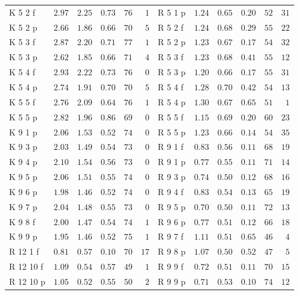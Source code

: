 \begin{tabular}{@{}lrrrrr@{\hspace{14pt}}lrrrrr@{}}
K 5 2 f & $2.97$ & $2.25$ & $0.73$ & $76$ & $1$ & R 5 1 p & $1.24$ & $0.65$ & $0.20$ & $52$ & $31$ \\
K 5 2 p & $2.66$ & $1.86$ & $0.66$ & $70$ & $5$ & R 5 2 f & $1.24$ & $0.68$ & $0.29$ & $55$ & $22$ \\
K 5 3 f & $2.87$ & $2.20$ & $0.71$ & $77$ & $1$ & R 5 2 p & $1.23$ & $0.67$ & $0.17$ & $54$ & $32$ \\
K 5 3 p & $2.62$ & $1.85$ & $0.66$ & $71$ & $4$ & R 5 3 f & $1.23$ & $0.68$ & $0.41$ & $55$ & $12$ \\
K 5 4 f & $2.93$ & $2.22$ & $0.73$ & $76$ & $0$ & R 5 3 p & $1.20$ & $0.66$ & $0.17$ & $55$ & $31$ \\
K 5 4 p & $2.74$ & $1.91$ & $0.70$ & $70$ & $5$ & R 5 4 f & $1.28$ & $0.70$ & $0.42$ & $54$ & $13$ \\
K 5 5 f & $2.76$ & $2.09$ & $0.64$ & $76$ & $1$ & R 5 4 p & $1.30$ & $0.67$ & $0.65$ & $51$ & $1$ \\
K 5 5 p & $2.82$ & $1.96$ & $0.86$ & $69$ & $0$ & R 5 5 f & $1.15$ & $0.69$ & $0.20$ & $60$ & $23$ \\
K 9 1 p & $2.06$ & $1.53$ & $0.52$ & $74$ & $0$ & R 5 5 p & $1.23$ & $0.66$ & $0.14$ & $54$ & $35$ \\
K 9 3 p & $2.03$ & $1.49$ & $0.54$ & $73$ & $0$ & R 9 1 f & $0.83$ & $0.56$ & $0.11$ & $68$ & $19$ \\
K 9 4 p & $2.10$ & $1.54$ & $0.56$ & $73$ & $0$ & R 9 1 p & $0.77$ & $0.55$ & $0.11$ & $71$ & $14$ \\
K 9 5 p & $2.06$ & $1.51$ & $0.55$ & $74$ & $0$ & R 9 3 p & $0.74$ & $0.50$ & $0.12$ & $68$ & $16$ \\
K 9 6 p & $1.98$ & $1.46$ & $0.52$ & $74$ & $0$ & R 9 4 f & $0.83$ & $0.54$ & $0.13$ & $65$ & $19$ \\
K 9 7 p & $2.04$ & $1.48$ & $0.55$ & $73$ & $0$ & R 9 5 p & $0.70$ & $0.50$ & $0.11$ & $72$ & $13$ \\
K 9 8 f & $2.00$ & $1.47$ & $0.54$ & $74$ & $1$ & R 9 6 p & $0.77$ & $0.51$ & $0.12$ & $66$ & $18$ \\
K 9 9 p & $1.95$ & $1.46$ & $0.52$ & $75$ & $1$ & R 9 7 f & $1.11$ & $0.51$ & $0.65$ & $46$ & $4$ \\
R 12 1 f & $0.81$ & $0.57$ & $0.10$ & $70$ & $17$ & R 9 8 p & $1.07$ & $0.50$ & $0.52$ & $47$ & $5$ \\
R 12 10 f & $1.09$ & $0.54$ & $0.57$ & $49$ & $1$ & R 9 9 f & $0.72$ & $0.51$ & $0.11$ & $70$ & $15$ \\
R 12 10 p & $1.05$ & $0.52$ & $0.55$ & $50$ & $2$ & R 9 9 p & $0.71$ & $0.53$ & $0.10$ & $74$ & $12$ \\
\bottomrule
\end{tabular}
